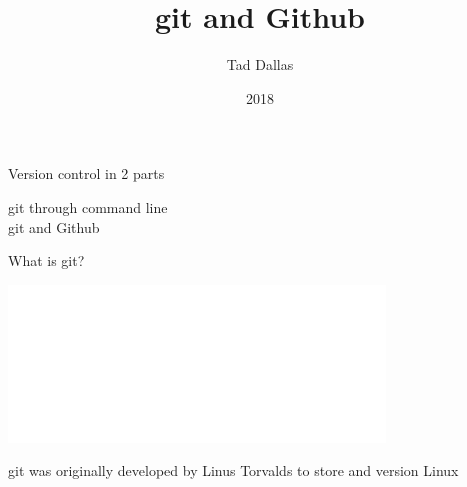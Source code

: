 \documentclass[12pt]{beamer}
\title{\Large git and Github}
\author{Tad Dallas}
\date{2018}
\begin{document}
\maketitle



\begin{frame}

	\begin{flushright}
	{\Large \textcolor{boss2}{Version control in 2 parts}}
	\end{flushright}

	\Huge	
	\textcolor{boss3}{git through command line} \\
	\bigskip
	\bigskip
	\textcolor{boss3}{git and Github} \\

\end{frame}







\begin{frame}

	\begin{flushright}
	{\Large \textcolor{boss2}{What is git?}}
	\end{flushright}
  \includegraphics[width=0.75\textwidth]{figs/Git-Logo-White.png}

\textcolor{boss3}{git was originally developed by Linus Torvalds to store and version Linux}


\end{frame}
\end{document}
